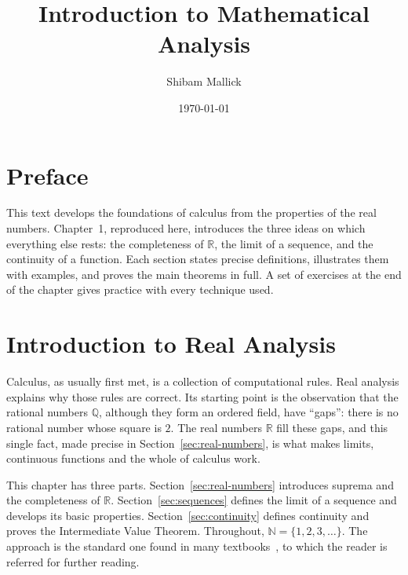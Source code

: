 \documentclass[11pt,a4paper]{book}
\newcommand{\N}{\mathbb{N}}
\newcommand{\Q}{\mathbb{Q}}
\newcommand{\R}{\mathbb{R}}
\numberwithin{equation}{section}          %
\theoremstyle{plain}
\theoremstyle{definition}
\theoremstyle{remark}
\begin{document}
\frontmatter
\title{Introduction to Mathematical Analysis}
\author{Shibam Mallick}
\date{\today}
\maketitle

\chapter*{Preface}
This text develops the foundations of calculus from the properties of the real numbers. Chapter~1, reproduced here, introduces the three ideas on which everything else rests: the completeness of $\R$, the limit of a sequence, and the continuity of a function. Each section states precise definitions, illustrates them with examples, and proves the main theorems in full. A set of exercises at the end of the chapter gives practice with every technique used.

\tableofcontents

\mainmatter

\chapter{Introduction to Real Analysis}\label{ch:real-analysis}

Calculus, as usually first met, is a collection of computational rules. Real analysis explains why those rules are correct. Its starting point is the observation that the rational numbers $\Q$, although they form an ordered field, have ``gaps'': there is no rational number whose square is $2$. The real numbers $\R$ fill these gaps, and this single fact, made precise in Section~\ref{sec:real-numbers}, is what makes limits, continuous functions and the whole of calculus work.

This chapter has three parts. Section~\ref{sec:real-numbers} introduces suprema and the completeness of $\R$. Section~\ref{sec:sequences} defines the limit of a sequence and develops its basic properties. Section~\ref{sec:continuity} defines continuity and proves the Intermediate Value Theorem. Throughout, $\N=\{1,2,3,\ldots\}$. The approach is the standard one found in many textbooks~\cite{rudin,abbott,bartle,apostol}, to which the reader is referred for further reading.

\end{document}
